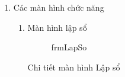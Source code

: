 \documentclass{article}
\begin{document}
\begin{enumerate}
\begin{itemize}
				\end{itemize}
			

			\newpage
			
			\item Các màn hình chức năng
			
				\begin{enumerate}
					\item Màn hình lập sổ
					

						\begin{flushleft}
							\begin{figure}[!h]
								\setlength\fboxsep{1pt}
								\setlength\fboxrule{1pt}
								\caption{frmLapSo}
								\label{fig:frmLapSo}
							\end{figure}
						\end{flushleft}

						\newpage
						Chi tiết màn hình Lập sổ
						
						\begin{tabular}{|c|c|c| p{5cm}|}
							

\end{tabular}
\end{enumerate}
\end{enumerate}
\end{document}
